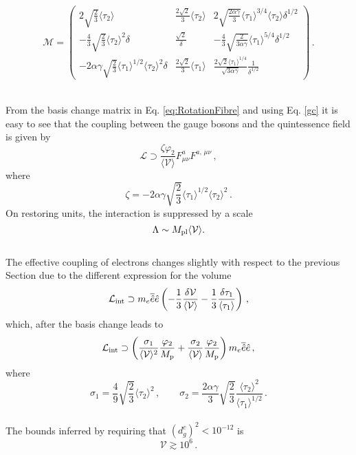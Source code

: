 \documentclass[11pt,a4paper]{article}
\newcommand{\be}{\begin{equation}}
\newcommand{\ee}{\end{equation}}
\newcommand{\V}{\mathcal{V}}
\begin{document}
\begin{equation}
\label{eq:RotationFibre}
\mathcal{M} = \begin{pmatrix}
2 \sqrt{\frac{2}{3}} \langle\tau_2\rangle & \frac{2 \sqrt{2}}{3} \langle \tau_2 \rangle & 2 \sqrt{\frac{2 \alpha \gamma}{3}} \langle \tau_1 \rangle^{3/4} \langle \tau_2 \rangle \delta^{1/2} \\
- \frac{4}{3} \sqrt{\frac{2}{3}} \langle \tau_2 \rangle^2 \delta & \frac{\sqrt{2}}{\delta} & - \frac{4}{3} \sqrt{\frac{2}{3 \alpha \gamma}} \langle \tau_1 \rangle^{5/4} \delta^{1/2}  \\
- 2 \alpha \gamma \sqrt{\frac{2}{3}} \langle \tau_1 \rangle^{1/2} \langle \tau_2 \rangle^2 \delta & \frac{2 \sqrt{2}}{3} \langle \tau_1 \rangle & \frac{2 \sqrt{2} \langle\tau_1\rangle^{1/4}}{\sqrt{3 \alpha \gamma}} \frac{1}{\delta^{1/2}}
\end{pmatrix} \,.
\end{equation}


\\ From the basis change matrix in Eq. \eqref{eq:RotationFibre} and using Eq. \eqref{gc} it is easy to see that the coupling between the gauge bosons and the quintessence field is given by
%
\begin{equation}
\mathcal{L} \supset \frac{\zeta \varphi_2}{\langle\V\rangle} F^a_{\mu \nu} F^{a,\,\mu \nu} \,,
\end{equation}
%
where
%
\begin{equation}
\zeta = - 2 \alpha \gamma \sqrt{\frac{2}{3}} \langle \tau_1 \rangle^{1/2} \langle \tau_2 \rangle^2 \,.
\end{equation}
%
On restoring units, the interaction is suppressed by a scale 
%
\be
\label{supr}
  \Lambda \sim M_{\rm pl} \langle\V\rangle.
\ee
%
\\ 
The effective coupling of electrons changes slightly with respect to the previous Section due to the different expression for the volume
\begin{equation}
\mathcal{L}_{\rm int} \supset m_e \overline{\hat{e}} \hat{e} \left(-\frac{1}{3} \frac{\delta \V}{\langle \V \rangle} - \frac{1}{3} \frac{\delta \tau_1}{\langle \tau_1 \rangle}\right) \,,
\end{equation}
which, after the basis change leads to 
\begin{equation}
\mathcal{L}_{\rm int} \supset \left(\frac{\sigma_1}{\langle \V \rangle^2} \frac{\varphi_2}{M_{\rm p}} + \frac{\sigma_2}{\langle \V \rangle} \frac{\varphi_2}{M_{\rm p}} \right) m_e \overline{\hat{e}} \hat{e} \,,
\end{equation}
where
%
\begin{equation}
\sigma_1 = \frac{4}{9} \sqrt{\frac{2}{3}} \langle \tau_2 \rangle^2 \,, \qquad \sigma_2 = \frac{2 \alpha \gamma}{3} \sqrt{\frac{2}{3}} \frac{\langle \tau_2 \rangle^2}{\langle \tau_1 \rangle^{1/2}} \,.
\end{equation}
%
\\ 
The bounds inferred by requiring that $\left(d_g^c\right)^2 < 10^{-12}$ is
\begin{equation}
\V \gtrsim 10^6 \,.
\end{equation}
\end{document}
